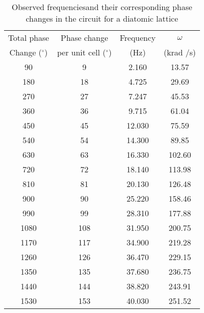 \begin{table}[]
    \centering
    \begin{tabular}{|c|c|c|c|}
    \hline
    Total phase & Phase change & Frequency & $\omega$ \\
    Change  ($^\circ$) & per unit cell ($^\circ$) & (Hz) & (krad /s) \\ \hline
    90 & 9 & 2.160 & 13.57 \\ 
    180 & 18 & 4.725 & 29.69 \\ 
    270 & 27 & 7.247 & 45.53 \\ 
    360 & 36 & 9.715 & 61.04 \\ 
    450 & 45 & 12.030 & 75.59 \\ 
    540 & 54 & 14.300 & 89.85 \\ 
    630 & 63 & 16.330 & 102.60 \\ 
    720 & 72 & 18.140 & 113.98 \\ 
    810 & 81 & 20.130 & 126.48 \\ 
    900 & 90 & 25.220 & 158.46 \\ 
    990 & 99 & 28.310 & 177.88 \\ 
    1080 & 108 & 31.950 & 200.75 \\ 
    1170 & 117 & 34.900 & 219.28 \\ 
    1260 & 126 & 36.470 & 229.15 \\ 
    1350 & 135 & 37.680 & 236.75 \\ 
    1440 & 144 & 38.820 & 243.91 \\ 
    1530 & 153 & 40.030 & 251.52 \\ \hline
    \end{tabular}
    \caption{Observed frequenciesand their corresponding phase changes in the circuit for a diatomic lattice}
    \label{tab:di1}
\end{table}